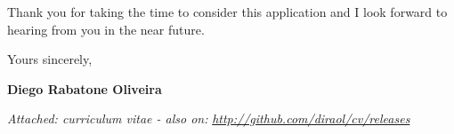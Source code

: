 \documentclass[11pt]{friggeri-cover-letter}
\begin{document}
Thank you for taking the time to consider this application and I look forward to hearing from you in the near future.

\vfill

\hfill Yours sincerely,

\hfill \textbf{Diego Rabatone Oliveira}

\vfill

\footnotesize{\thinfont\color{lightgray}\textit{Attached: curriculum vitae - also on:} \textit{\url{http://github.com/diraol/cv/releases}}}
\end{document}
